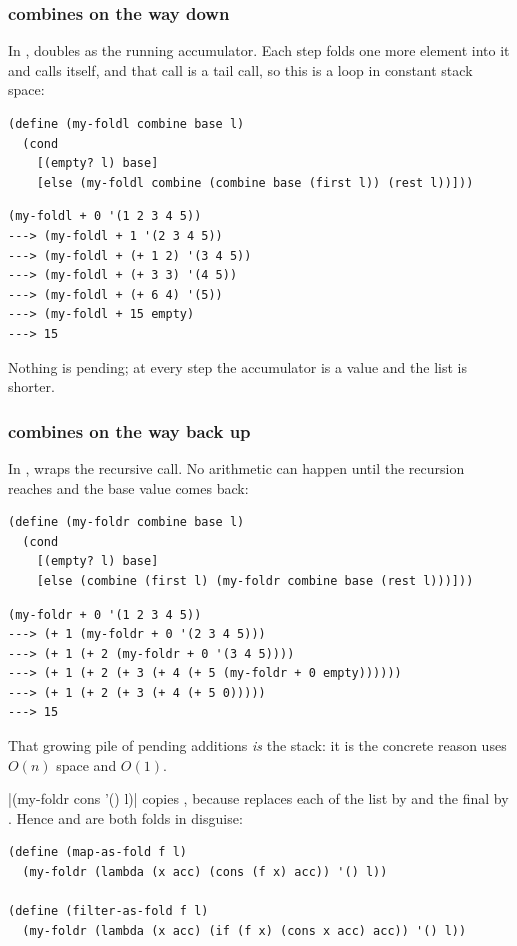 \subsubsection{ combines on the way down} In ,  doubles as the running accumulator. Each step folds one more element into it and calls itself, and that call is a tail call, so this is a loop in constant stack space:
\begin{lstlisting}
(define (my-foldl combine base l)
  (cond
    [(empty? l) base]
    [else (my-foldl combine (combine base (first l)) (rest l))]))
\end{lstlisting}
\begin{lstlisting}[style=repl]
(my-foldl + 0 '(1 2 3 4 5))
---> (my-foldl + 1 '(2 3 4 5))
---> (my-foldl + (+ 1 2) '(3 4 5))
---> (my-foldl + (+ 3 3) '(4 5))
---> (my-foldl + (+ 6 4) '(5))
---> (my-foldl + 15 empty)
---> 15
\end{lstlisting}
Nothing is pending; at every step the accumulator is a value and the list is shorter.

\subsubsection{ combines on the way back up} In ,  wraps the recursive call. No arithmetic can happen until the recursion reaches  and the base value comes back:
\begin{lstlisting}
(define (my-foldr combine base l)
  (cond
    [(empty? l) base]
    [else (combine (first l) (my-foldr combine base (rest l)))]))
\end{lstlisting}
\begin{lstlisting}[style=repl]
(my-foldr + 0 '(1 2 3 4 5))
---> (+ 1 (my-foldr + 0 '(2 3 4 5)))
---> (+ 1 (+ 2 (my-foldr + 0 '(3 4 5))))
---> (+ 1 (+ 2 (+ 3 (+ 4 (+ 5 (my-foldr + 0 empty))))))
---> (+ 1 (+ 2 (+ 3 (+ 4 (+ 5 0)))))
---> 15
\end{lstlisting}
That growing pile of pending additions \emph{is} the stack: it is the concrete reason  uses $O(n)$ space and  $O(1)$.

\begin{keypoint}
\rkt|(my-foldr cons '() l)| copies , because  replaces each  of the list by  and the final  by . Hence  and  are both folds in disguise:
\begin{lstlisting}
(define (map-as-fold f l)
  (my-foldr (lambda (x acc) (cons (f x) acc)) '() l))

(define (filter-as-fold f l)
  (my-foldr (lambda (x acc) (if (f x) (cons x acc) acc)) '() l))
\end{lstlisting}
\end{keypoint}

